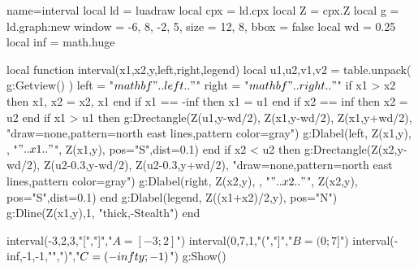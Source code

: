 \documentclass[border=5mm]{standalone}
\begin{document}
\begin{luadraw}{name=interval}
local ld = luadraw
local cpx = ld.cpx
local Z = cpx.Z
local g = ld.graph:new{ window = {-6, 8, -2, 5}, size = {12, 8}, bbox = false }
local wd = 0.25
local inf = math.huge

local function interval(x1,x2,y,left,right,legend)
    local u1,u2,v1,v2 = table.unpack( g:Getview() )
    left = "$\\mathbf{"..left.."}$"
    right = "$\\mathbf{"..right.."}$"
    if x1 > x2 then x1, x2 = x2, x1 end
    if x1 == -inf then x1 = u1 end
    if x2 == inf then x2 = u2 end
    if x1 > u1 then
        g:Drectangle(Z(u1,y-wd/2), Z(x1,y-wd/2), Z(x1,y+wd/2), "draw=none,pattern=north east lines,pattern color=gray")
        g:Dlabel(left, Z(x1,y), {}, "$"..x1.."$", Z(x1,y), {pos="S",dist=0.1})
    end
    if x2 < u2 then
        g:Drectangle(Z(x2,y-wd/2), Z(u2-0.3,y-wd/2), Z(u2-0.3,y+wd/2), "draw=none,pattern=north east lines,pattern color=gray")
        g:Dlabel(right, Z(x2,y), {}, "$"..x2.."$", Z(x2,y), {pos="S",dist=0.1})
    end
    g:Dlabel(legend, Z((x1+x2)/2,y), {pos="N"})
    g:Dline({Z(x1,y),1}, "thick,-Stealth")
end

interval(-3,2,3,"[","]","$A = [-3; 2]$")
interval(0,7,1,"(","]","$B = (0; 7]$")
interval(-inf,-1,-1,"",")","$C = (-\\infty;-1)$")
g:Show()
\end{luadraw}
\end{document}

